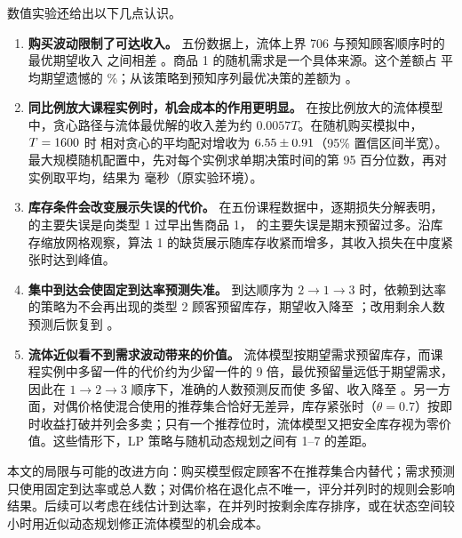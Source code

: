 数值实验还给出以下几点认识。
\begin{enumerate}[label=(\arabic*)]
\item \textbf{购买波动限制了可达收入。} 五份数据上，流体上界 706 与预知顾客顺序时的最优期望收入 \ERSeq{} 之间相差 \FluidGap。商品 1 的随机需求是一个具体来源。这个差额占 \LPDual{} 平均期望遗憾的 \FluidShare\%；从该策略到预知序列最优决策的差额为 \LavgDual。
\item \textbf{同比例放大课程实例时，机会成本的作用更明显。} 在按比例放大的流体模型中，贪心路径与流体最优解的收入差为约 $0.0057T$。在随机购买模拟中，$T=1600$ 时 \LPDual{} 相对贪心的平均配对增收为 $6.55\pm0.91$（95\% 置信区间半宽）。最大规模随机配置中，先对每个实例求单期决策时间的第 95 百分位数，再对实例取平均，结果为 \LargeTimeP{} 毫秒（原实验环境）。
\item \textbf{库存条件会改变展示失误的代价。} 在五份课程数据中，逐期损失分解表明，\Greedy{} 的主要失误是向类型 1 过早出售商品 1，\LPFD{} 的主要失误是期末预留过多。沿库存缩放网格观察，算法 1 的缺货展示随库存收紧而增多，其收入损失在中度紧张时达到峰值。
\item \textbf{集中到达会使固定到达率预测失准。} 到达顺序为 $2\to1\to3$ 时，依赖到达率的策略为不会再出现的类型 2 顾客预留库存，期望收入降至 \BlockDual；改用剩余人数预测后恢复到 \BlockCount。
\item \textbf{流体近似看不到需求波动带来的价值。} 流体模型按期望需求预留库存，而课程实例中多留一件的代价约为少留一件的 9 倍，最优预留量远低于期望需求，因此在 $1\to2\to3$ 顺序下，准确的人数预测反而使 \LPCount{} 多留、收入降至 \BlockOTTCount。另一方面，对偶价格使混合使用的推荐集合恰好无差异，库存紧张时（$\theta=0.7$）按即时收益打破并列会多卖；只有一个推荐位时，流体模型又把安全库存视为零价值。这些情形下，LP 策略与随机动态规划之间有 1--7 的差距。
\end{enumerate}

本文的局限与可能的改进方向：购买模型假定顾客不在推荐集合内替代；需求预测只使用固定到达率或总人数；对偶价格在退化点不唯一，评分并列时的规则会影响结果。后续可以考虑在线估计到达率，在并列时按剩余库存排序，或在状态空间较小时用近似动态规划修正流体模型的机会成本。
